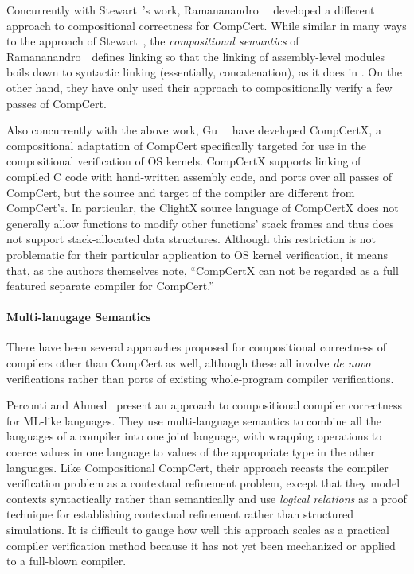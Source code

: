 Concurrently with Stewart~\etal's work, Ramananandro~\etal~\cite{ramananandro+:cpp2015}
developed a different approach to compositional correctness for
CompCert.  While similar in many ways to the approach of
Stewart~\etal, the \emph{compositional semantics} of
Ramananandro~\etal\ defines linking so that the linking of
assembly-level modules boils down to syntactic linking (essentially,
concatenation), as it does in \sepcomp{}.  On the other hand, they
have only used their approach to compositionally verify a few passes
of CompCert.

Also concurrently with the above work, Gu~\etal~\cite{gu+:popl2015} have
developed CompCertX, a compositional adaptation of CompCert
specifically targeted for use in the compositional verification of OS
kernels.  CompCertX supports linking of compiled C code with
hand-written assembly code, and ports over all passes of CompCert, but
the source and target of the compiler are different from CompCert's.
In particular, the ClightX source language of CompCertX does not
generally allow functions to modify other functions' stack frames and
thus does not support stack-allocated data structures.  Although this
restriction is not problematic for their particular application to OS
kernel verification, it means that, as the authors themselves note,
``CompCertX can not be regarded as a full featured separate compiler
for CompCert.''

\paragraph{Multi-lanugage Semantics}

There have been several approaches proposed for compositional
correctness of compilers other than CompCert as well, although these
all involve \emph{de novo} verifications rather than ports of existing
whole-program compiler verifications.

Perconti and Ahmed~\cite{perconti+:esop14}  present an approach to compositional
compiler correctness for ML-like languages.  They use multi-language
semantics to combine all the languages of a compiler into one joint
language, with wrapping operations to coerce values in one language to
values of the appropriate type in the other languages.  Like
Compositional CompCert, their approach recasts the compiler
verification problem as a contextual refinement problem, except that
they model contexts syntactically rather than semantically and use
\emph{logical relations} as a proof technique for establishing
contextual refinement rather than structured simulations.  It is
difficult to gauge how well this approach scales as a practical
compiler verification method because it has not yet been mechanized or
applied to a full-blown compiler.

